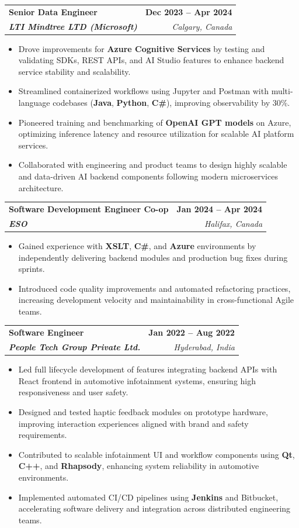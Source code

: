 \documentclass[letterpaper,11pt]{article}
\makeatletter
\newcommand{\resumeItem}[1]{
  \item\small{
    {#1 \vspace{-2pt}}
  }
}
\newcommand{\resumeSubheading}[4]{
  \vspace{-2pt}\item
    \begin{tabular*}{1.0\textwidth}[t]{l@{\extracolsep{\fill}}r}
      \textbf{#1} & \textbf{\small #2} \\
      \textit{\small#3} & \textit{\small #4} \\
    \end{tabular*}\vspace{-7pt}
}
\newcommand{\resumeItemListStart}{\begin{itemize}}
\newcommand{\resumeItemListEnd}{\end{itemize}\vspace{-5pt}}
\makeatother
\begin{document}
    \resumeSubheading
      {\textbf{Senior Data Engineer}}{\textbf{Dec 2023 -- Apr 2024}}
      {\textbf{LTI Mindtree LTD (Microsoft)}}{Calgary, Canada}
      \resumeItemListStart
        \resumeItem{Drove improvements for \textbf{Azure Cognitive Services} by testing and validating SDKs, REST APIs, and AI Studio features to enhance backend service stability and scalability.}
        \resumeItem{Streamlined containerized workflows using Jupyter and Postman with multi-language codebases (\textbf{Java}, \textbf{Python}, \textbf{C\#}), improving observability by 30\%.}
        \resumeItem{Pioneered training and benchmarking of \textbf{OpenAI GPT models} on Azure, optimizing inference latency and resource utilization for scalable AI platform services.}
        \resumeItem{Collaborated with engineering and product teams to design highly scalable and data-driven AI backend components following modern microservices architecture.}
      \resumeItemListEnd
    
    \resumeSubheading
      {\textbf{Software Development Engineer Co-op}}{\textbf{Jan 2024 -- Apr 2024}}
      {\textbf{ESO}}{Halifax, Canada}
      \resumeItemListStart
        \resumeItem{Gained experience with \textbf{XSLT}, \textbf{C\#}, and \textbf{Azure} environments by independently delivering backend modules and production bug fixes during sprints.}
        \resumeItem{Introduced code quality improvements and automated refactoring practices, increasing development velocity and maintainability in cross-functional Agile teams.}
      \resumeItemListEnd

    \resumeSubheading
      {\textbf{Software Engineer}}{\textbf{Jan 2022 -- Aug 2022}}
      {\textbf{People Tech Group Private Ltd.}}{Hyderabad, India}
      \resumeItemListStart
        \resumeItem{Led full lifecycle development of features integrating backend APIs with React frontend in automotive infotainment systems, ensuring high responsiveness and user safety.}
        \resumeItem{Designed and tested haptic feedback modules on prototype hardware, improving interaction experiences aligned with brand and safety requirements.}
        \resumeItem{Contributed to scalable infotainment UI and workflow components using \textbf{Qt}, \textbf{C++}, and \textbf{Rhapsody}, enhancing system reliability in automotive environments.}
        \resumeItem{Implemented automated CI/CD pipelines using \textbf{Jenkins} and Bitbucket, accelerating software delivery and integration across distributed engineering teams.}
      \resumeItemListEnd
\end{document}
